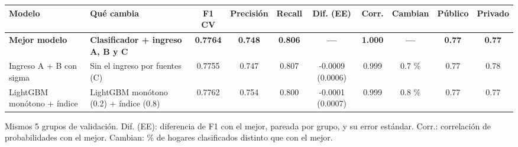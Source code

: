 
\begin{threeparttable}
\begin{tabular}[t]{llcccccccc}
\toprule
Modelo & Qué cambia & F1 CV & Precisión & Recall & Dif. (EE) & Corr. & Cambian & Público & Privado\\
\midrule
\textbf{Mejor modelo} & \textbf{Clasificador + ingreso A, B y C} & \textbf{0.7764} & \textbf{0.748} & \textbf{0.806} & \textbf{---} & \textbf{1.000} & \textbf{---} & \textbf{0.77} & \textbf{0.77}\\
Ingreso A + B con sigma & Sin el ingreso por fuentes (C) & 0.7755 & 0.747 & 0.807 & -0.0009 (0.0006) & 0.999 & 0.7 \% & 0.77 & 0.78\\
LightGBM monótono + índice & LightGBM monótono (0.2) + índice (0.8) & 0.7762 & 0.754 & 0.800 & -0.0001 (0.0007) & 0.999 & 0.8 \% & 0.77 & 0.77\\
\bottomrule
\end{tabular}
\begin{tablenotes}
\item Mismos 5 grupos de validación. Dif. (EE): diferencia de F1 con el mejor, pareada por grupo, y su error estándar. Corr.: correlación de probabilidades con el mejor. Cambian: \% de hogares clasificados distinto que con el mejor.
\end{tablenotes}
\end{threeparttable}
